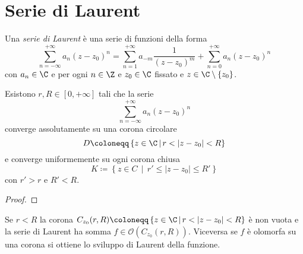 \chapter{Serie di Laurent}

\begin{definition}
  Una \emph{serie di Laurent} è una serie di funzioni della forma 
  \begin{equation*}
    \sum_{n=-\infty}^{+\infty} a_n(z-z_0)^n = \sum_{n=1}^{+\infty} a_{-m}
            \frac{1}{(z-z_0)^m} + \sum_{n=0}^{+\infty} a_n(z - z_0)^{n}
  \end{equation*}
con $a_n \in \C$ e per ogni $n \in \Z$ e $z_0 \in \C$ fissato e $z\in \C
\setminus \left\{ z_0 \right\}$.
  \label{def:serie_laurent}
\end{definition}

\begin{proposition}
  Esistono $r, R \in \left[ 0, +\infty \right]$ tali che la serie 
  \begin{equation*}
    \sum_{n=-\infty}^{+\infty} a_n(z-z_0)^n
  \end{equation*}
  converge assolutamente su una corona circolare 
  \begin{equation*}
    D \coloneqq \left\{ z \in \C \,\middle|\, r < |z-z_0| < R \right\}
  \end{equation*}
  e converge uniformemente su ogni corona chiusa
  \begin{equation*}
    K \coloneqq \left\{ z \in C \,\middle|\, r' \le |z-z_0| \le R' \right\}
  \end{equation*}
  con $r' > r$ e $R' < R$.
  \label{prp:convergenza_ass_unif_laurent}
\end{proposition}
\begin{proof}
\end{proof}

\begin{remark}
  Se $r < R$ la corona $C_{z_0}(r,R) \coloneqq \left\{ z \in \C \,\middle|\,
  r < |z - z_0|  < R \right\}$ è non vuota e la serie di Laurent ha somma $f \in
  \mathcal{O}(C_{z_0}(r,R))$. Viceversa se $f$ è olomorfa su una corona si
  ottiene lo sviluppo di Laurent della funzione.
  \label{rmk:reverso_card_holo_func}
\end{remark}

